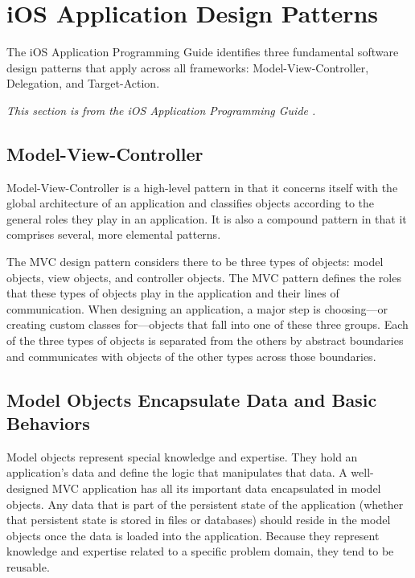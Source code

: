 \section{iOS Application Design Patterns}
\label{sect:cocoa}

The iOS Application Programming Guide identifies three fundamental software
design patterns that apply across all frameworks: Model-View-Controller,
Delegation, and Target-Action.

\emph{This section is from the iOS Application Programming Guide
\cite[p.~160--165]{ios:cocoa-fundamentals}.}

\subsection{Model-View-Controller}
\label{sect:cocoa_mvc}

Model-View-Controller is a high-level pattern in that it concerns itself
with the global architecture of an application and classifies objects
according to the general roles they play in an application. It is also a
compound pattern in that it comprises several, more elemental patterns.

The MVC design pattern considers there to be three types of objects: model
objects, view objects, and controller objects. The MVC pattern defines the
roles that these types of objects play in the application and their lines of
communication. When designing an application, a major step is choosing---or
creating custom classes for---objects that fall into one of these three
groups. Each of the three types of objects is separated from the others by
abstract boundaries and communicates with objects of the other types across
those boundaries.

\subsection{Model Objects Encapsulate Data and Basic Behaviors}

Model objects represent special knowledge and expertise. They hold an
application's data and define the logic that manipulates that data. A
well-designed MVC application has all its important data encapsulated in model
objects. Any data that is part of the persistent state of the application
(whether that persistent state is stored in files or databases) should reside in
the model objects once the data is loaded into the application. Because they
represent knowledge and expertise related to a specific problem domain, they
tend to be reusable.


